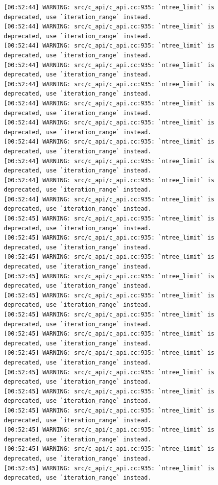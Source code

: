 \documentclass[
  letterpaper,
  DIV=11,
  numbers=noendperiod]{scrartcl}
\begin{document}
\begin{verbatim}
[00:52:44] WARNING: src/c_api/c_api.cc:935: `ntree_limit` is deprecated, use `iteration_range` instead.
[00:52:44] WARNING: src/c_api/c_api.cc:935: `ntree_limit` is deprecated, use `iteration_range` instead.
[00:52:44] WARNING: src/c_api/c_api.cc:935: `ntree_limit` is deprecated, use `iteration_range` instead.
[00:52:44] WARNING: src/c_api/c_api.cc:935: `ntree_limit` is deprecated, use `iteration_range` instead.
[00:52:44] WARNING: src/c_api/c_api.cc:935: `ntree_limit` is deprecated, use `iteration_range` instead.
[00:52:44] WARNING: src/c_api/c_api.cc:935: `ntree_limit` is deprecated, use `iteration_range` instead.
[00:52:44] WARNING: src/c_api/c_api.cc:935: `ntree_limit` is deprecated, use `iteration_range` instead.
[00:52:44] WARNING: src/c_api/c_api.cc:935: `ntree_limit` is deprecated, use `iteration_range` instead.
[00:52:44] WARNING: src/c_api/c_api.cc:935: `ntree_limit` is deprecated, use `iteration_range` instead.
[00:52:44] WARNING: src/c_api/c_api.cc:935: `ntree_limit` is deprecated, use `iteration_range` instead.
[00:52:44] WARNING: src/c_api/c_api.cc:935: `ntree_limit` is deprecated, use `iteration_range` instead.
[00:52:45] WARNING: src/c_api/c_api.cc:935: `ntree_limit` is deprecated, use `iteration_range` instead.
[00:52:45] WARNING: src/c_api/c_api.cc:935: `ntree_limit` is deprecated, use `iteration_range` instead.
[00:52:45] WARNING: src/c_api/c_api.cc:935: `ntree_limit` is deprecated, use `iteration_range` instead.
[00:52:45] WARNING: src/c_api/c_api.cc:935: `ntree_limit` is deprecated, use `iteration_range` instead.
[00:52:45] WARNING: src/c_api/c_api.cc:935: `ntree_limit` is deprecated, use `iteration_range` instead.
[00:52:45] WARNING: src/c_api/c_api.cc:935: `ntree_limit` is deprecated, use `iteration_range` instead.
[00:52:45] WARNING: src/c_api/c_api.cc:935: `ntree_limit` is deprecated, use `iteration_range` instead.
[00:52:45] WARNING: src/c_api/c_api.cc:935: `ntree_limit` is deprecated, use `iteration_range` instead.
[00:52:45] WARNING: src/c_api/c_api.cc:935: `ntree_limit` is deprecated, use `iteration_range` instead.
[00:52:45] WARNING: src/c_api/c_api.cc:935: `ntree_limit` is deprecated, use `iteration_range` instead.
[00:52:45] WARNING: src/c_api/c_api.cc:935: `ntree_limit` is deprecated, use `iteration_range` instead.
[00:52:45] WARNING: src/c_api/c_api.cc:935: `ntree_limit` is deprecated, use `iteration_range` instead.
[00:52:45] WARNING: src/c_api/c_api.cc:935: `ntree_limit` is deprecated, use `iteration_range` instead.
[00:52:45] WARNING: src/c_api/c_api.cc:935: `ntree_limit` is deprecated, use `iteration_range` instead.

\end{verbatim}
\end{document}
